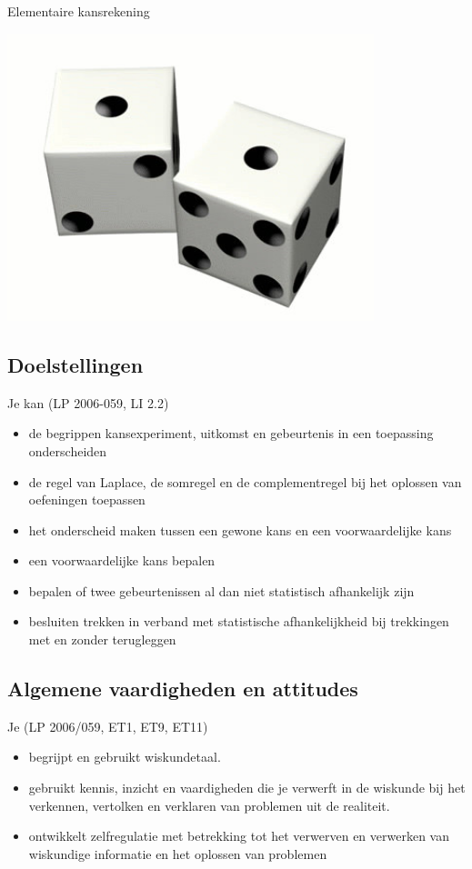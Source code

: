 \documentclass[12pt,twoside]{article}
\begin{document}
\thispagestyle{empty}
\begin{center}
  \begin{mdframed}
  \centering
  \fontsize{40}{60}\selectfont Elementaire kansrekening
  \end{mdframed}
  \includegraphics[width=0.8\textwidth]{dice}
\end{center}
\vspace*{-3cm}
\subsection*{Doelstellingen}
{\singlespacing
Je kan \hfill  {\scriptsize(LP 2006-059, LI 2.2)}
\begin{itemize}
  \item de begrippen kansexperiment, uitkomst en gebeurtenis in een toepassing onderscheiden
  \item de regel van Laplace, de somregel en de complementregel bij het oplossen van oefeningen toepassen
  \item het onderscheid maken tussen een gewone kans en een voorwaardelijke kans
  \item een voorwaardelijke kans bepalen
  \item bepalen of twee gebeurtenissen al dan niet statistisch afhankelijk zijn
  \item besluiten trekken in verband met statistische afhankelijkheid bij trekkingen met en zonder terugleggen
\end{itemize}}
\subsection*{Algemene vaardigheden en attitudes}
{\singlespacing
Je \hfill {\scriptsize(LP 2006/059, ET1, ET9, ET11)}
\begin{itemize}
  \itemsep0em
  \item begrijpt en gebruikt wiskundetaal.
  \item gebruikt kennis, inzicht en vaardigheden die je verwerft in de wiskunde bij het verkennen, vertolken en verklaren van problemen uit de realiteit.
  \item ontwikkelt zelfregulatie met betrekking tot het verwerven en verwerken van wiskundige informatie en het oplossen van problemen
\end{itemize}
}
\vspace*{-2cm}
\end{document}
